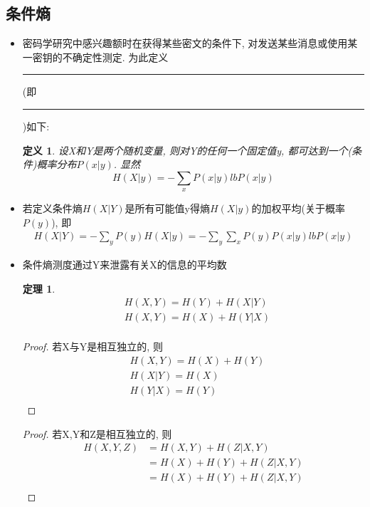\documentclass[UTF8]{ctexart}
\newcommand\hl{\bgroup\markoverwith
  {\textcolor{yellow}{\rule[-.5ex]{2pt}{2.5ex}}}\ULon}
\newtheorem{theorem}{\hspace{2em}定理}[section]
\newtheorem{definition}{\hspace{2em}定义}[section]
\newtheorem{proof}{\hspace{2em}证明}[section]
\begin{document}
\subsection{条件熵}
\begin{itemize}
  \item 密码学研究中感兴趣额时在获得某些密文的条件下, 对发送某些消息或使用某一密钥的不确定性测定. 为此定义\hl{暧昧度}(即\hl{条件熵})如下:
  \begin{definition}
    设X和Y是两个随机变量, 则对Y的任何一个固定值y, 都可达到一个(条件)概率分布$P(x|y)$. 显然
    $$H(X|y)=-\sum\limits_x P(x|y)lbP(x|y)$$
  \end{definition}
  \item 若定义条件熵$H(X|Y)$是所有可能值y得熵$H(X|y)$的加权平均(关于概率$P(y)$), 即
  $$
  \begin{aligned}
    H(X|Y)=-\sum\limits_y P(y)H(X|y)=-\sum\limits_y \sum\limits_x P(y)P(x|y)lbP(x|y)
  \end{aligned}
  $$
  \item 条件熵测度通过Y来泄露有关X的信息的平均数
  \begin{theorem}
    $$
    \begin{aligned}
      &H(X, Y)=H(Y)+H(X|Y)\\
      &H(X, Y)=H(X)+H(Y|X)\\
    \end{aligned}
    $$
  \end{theorem}

  \begin{proof}
    若X与Y是相互独立的, 则
    $$
    \begin{aligned}
      &H(X,Y)=H(X)+H(Y)\\
      &H(X|Y)=H(X)\\
      &H(Y|X)=H(Y)\\
    \end{aligned}
    $$
  \end{proof}
  \begin{proof}
    若X,Y和Z是相互独立的, 则
    $$
    \begin{aligned}
      H(X,Y,Z)&=H(X,Y)+H(Z|X,Y)\\
              &=H(X)+H(Y)+H(Z|X,Y)\\
              &=H(X)+H(Y)+H(Z|X,Y)\\
    \end{aligned}
    $$
  \end{proof}
\end{itemize}
\end{document}
